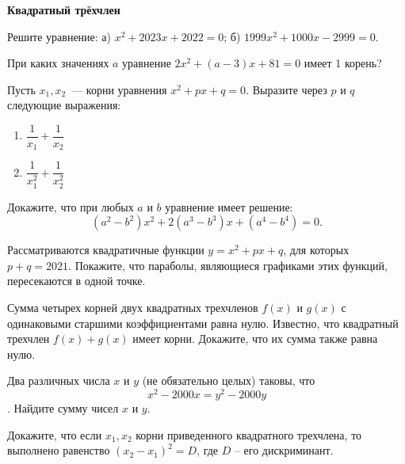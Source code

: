 \documentclass{article}
\begin{document}
    \large

    \begin{center}
        \textbf{Квадратный трёхчлен}
    \end{center}

    \begin{enumerate_boxed}

        \item Решите уравнение: а) $x^2 + 2023x + 2022 = 0$; б) $1999x^2 + 1000x-2999=0$.

        \item При каких значениях $a$ уравнение $2x^2 + (a - 3)x + 81 = 0$ имеет 1 корень?

        \item Пусть $x_1, x_2$~--- корни уравнения  $x^2 + px + q = 0$.
        Выразите через $p$ и $q$ следующие выражения:
        \begin{enumerate}

            \item $\dfrac{1}{x_1} + \dfrac{1}{x_2}$

            \item $\dfrac{1}{x_1^2} + \dfrac{1}{x_2^2}$

        \end{enumerate}

        \item Докажите, что при любых $a$ и $b$ уравнение имеет решение:
        \[(a^2 - b^2)x^2 + 2(a^3 - b^3)x + (a^4 -b^4) =0.\]

        \item Рассматриваются квадратичные функции  $y = x^2 + px + q$,  для которых  $p + q = 2021$.
        Покажите, что параболы, являющиеся графиками этих функций, пересекаются в одной точке.

        \item Сумма четырех корней двух квадратных трехчленов $f(x)$ и $g(x)$ с одинаковыми старшими коэффициентами равна нулю.
        Известно, что квадратный трехчлен $f(x)+g(x)$ имеет корни.
        Докажите, что их сумма также равна нулю.

        \item Два различных числа $x$ и $y$ (не обязательно целых) таковы, что \[x^2 - 2000x = y^2 - 2000y\].
        Найдите сумму чисел $x$ и $y$.

        \item Докажите, что если $x_1 , x_2$ корни приведенного квадратного трехчлена, то выполнено равенство $(x_2 - x_1)^2 = D$, где $D$ – его дискриминант.


\end{enumerate_boxed}
\end{document}
